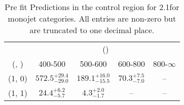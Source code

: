 \begin{table}[h!]
\tiny
\centering
\caption{Pre fit Predictions in the \gj control region for 2.1\ifb for monojet categories. All entries are non-zero but are truncated to one decimal place.\label{tab:predsepnaive_gj_ewk_mono}}
\begin{tabular}
{ccccc}
	\hline\hline
	& \multicolumn{4}{c}{\scalht (\gev)} \\ 
	 (\njet,  \nb) & 400-500 & 500-600 & 600-800 & 800-$\infty$ \\ [0.8ex] 
\hline
	(1, 0) & $572.5^{+ 29.4 }_{- 29.0 }$ & $189.1^{+ 16.0 }_{- 15.5 }$ & $70.3^{+ 7.5 }_{- 7.0 }$ & -- \\[0.5ex] 
	(1, 1) & $24.4^{+ 6.2 }_{- 5.7 }$ & $4.3^{+ 2.0 }_{- 1.7 }$ & -- & -- \\[0.5ex] 
	\hline
	\hline
\end{tabular}
\end{table}
